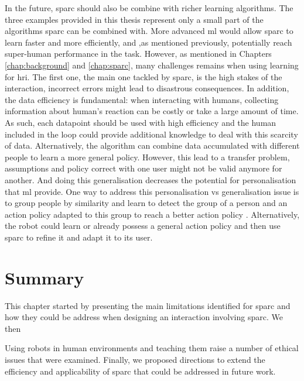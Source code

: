 In the future, \gls{sparc} should also be combine with richer learning algorithms. The three examples provided in this thesis represent only a small part of the algorithms \gls{sparc} can be combined with. More advanced \gls{ml} would allow \gls{sparc} to learn faster and more efficiently, and ,as mentioned previously, potentially reach super-human performance in the task. However, as mentioned in Chapters \ref{chap:background} and \ref{chap:sparc}, many challenges remains when using learning for \gls{hri}. The first one, the main one tackled by \gls{sparc}, is the high stakes of the interaction, incorrect errors might lead to disastrous consequences. In addition, the data efficiency is fundamental: when interacting with humans, collecting information about human's reaction can be costly or take a large amount of time. As such, each datapoint should be used with high efficiency and the human included in the loop could provide additional knowledge to deal with this scarcity of data. Alternatively, the algorithm can combine data accumulated with different people to learn a more general policy. However, this lead to a transfer problem, assumptions and policy correct with one user might not be valid anymore for another. And doing this generalisation decreases the potential for personalisation that \gls{ml} provide. One way to address this personalisation vs generalisation issue is to group people by similarity and learn to detect the group of a person and an action policy adapted to this group to reach a better action policy \citep{brunskill2014pac}. Alternatively, the robot could learn or already possess a general action policy and then use \gls{sparc} to refine it and adapt it to its user. 

\section{Summary} \label{sec:disc_summary}


This chapter started by presenting the main limitations identified for \gls{sparc} and how they could be address when designing an interaction involving \gls{sparc}. We then 

Using robots in human environments and teaching them raise a number of ethical issues that were examined. Finally, we proposed directions to extend the efficiency and applicability of \gls{sparc} that could be addressed in future work.

